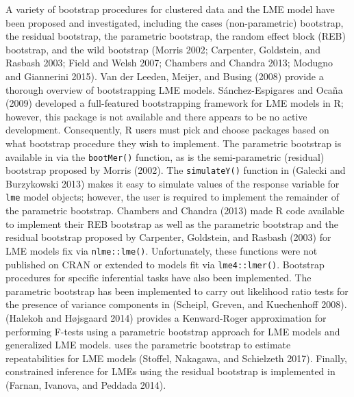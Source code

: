 A variety of bootstrap procedures for clustered data and the LME model have been proposed and investigated, including the cases (non-parametric) bootstrap, the residual bootstrap, the parametric bootstrap, the random effect block (REB) bootstrap, and the wild bootstrap (Morris 2002; Carpenter, Goldstein, and Rasbash 2003; Field and Welsh 2007; Chambers and Chandra 2013; Modugno and Giannerini 2015). Van der Leeden, Meijer, and Busing (2008) provide a thorough overview of bootstrapping LME models. Sánchez-Espigares and Ocaña (2009) developed a full-featured bootstrapping framework for LME models in R; however, this package is not available and there appears to be no active development. Consequently, R users must pick and choose packages based on what bootstrap procedure they wish to implement. The parametric bootstrap is available in  via the \texttt{bootMer()} function, as is the semi-parametric (residual) bootstrap proposed by Morris (2002). The \texttt{simulateY()} function in  (Galecki and Burzykowski 2013) makes it easy to simulate values of the response variable for \texttt{lme} model objects; however, the user is required to implement the remainder of the parametric bootstrap. Chambers and Chandra (2013) made R code available to implement their REB bootstrap as well as the parametric bootstrap and the residual bootstrap proposed by Carpenter, Goldstein, and Rasbash (2003) for LME models fix via \texttt{nlme::lme()}. Unfortunately, these functions were not published on CRAN or extended to models fit via \texttt{lme4::lmer()}. Bootstrap procedures for specific inferential tasks have also been implemented. The parametric bootstrap has been implemented to carry out likelihood ratio tests for the presence of variance components in  (Scheipl, Greven, and Kuechenhoff 2008).  (Halekoh and Højsgaard 2014) provides a Kenward-Roger approximation for performing F-tests using a parametric bootstrap approach for LME models and generalized LME models.  uses the parametric bootstrap to estimate repeatabilities for LME models (Stoffel, Nakagawa, and Schielzeth 2017). Finally, constrained inference for LMEs using the residual bootstrap is implemented in  (Farnan, Ivanova, and Peddada 2014).

